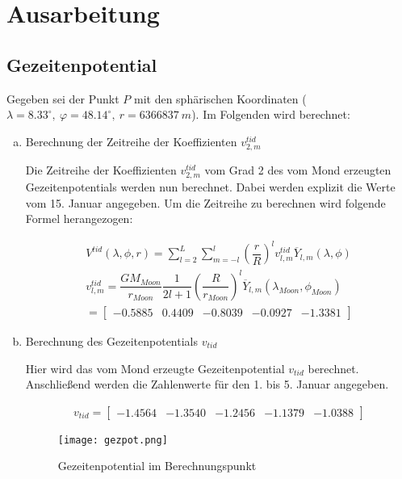 \chapter*{Ausarbeitung}

\section{Gezeitenpotential}

Gegeben sei der Punkt $P$ mit den sphärischen Koordinaten ($\lambda = 8.33^{\circ},~ \varphi = 48.14^{\circ},~r = 6366837~m$). Im Folgenden wird berechnet: 

\begin{enumerate}[a)]
\item Berechnung der Zeitreihe der Koeffizienten $v_{2,m}^{tid}$ 

Die Zeitreihe der Koeffizienten $v_{2,m}^{tid}$ vom Grad 2 des vom Mond erzeugten Gezeitenpotentials werden nun berechnet. Dabei werden explizit die Werte vom 15. Januar angegeben. Um die Zeitreihe zu berechnen wird folgende Formel herangezogen: 

\begin{gather*}
V^{tid}(\lambda, \phi, r) = \sum_{l=2}^{L} \sum_{m=-l}^{l} \left(\dfrac{r}{R}\right)^l v_{l,m}^{tid} \overline{Y}_{l,m}(\lambda,\phi) \\
v_{l,m}^{tid} = \dfrac{GM_{Moon}}{r_{Moon}} \dfrac{1}{2l+1} \left(\dfrac{R}{r_{Moon}}\right)^l \overline{Y}_{l,m} (\lambda_{Moon},\phi_{Moon}) \\
= \begin{bmatrix}
-0.5885 &  0.4409 &  -0.8039  & -0.0927 & -1.3381
\end{bmatrix}
\end{gather*} 

\item Berechnung des Gezeitenpotentials $v_{tid}$ 

Hier wird das vom Mond erzeugte Gezeitenpotential $v_{tid}$ berechnet. Anschließend werden die Zahlenwerte für den 1. bis 5. Januar angegeben. 

\begin{gather*}
v_{tid} = \begin{bmatrix}
-1.4564&-1.3540&-1.2456&-1.1379&-1.0388
\end{bmatrix}
\end{gather*}

\begin{figure}[H]
\centering
\texttt{[image: gezpot.png]}
\caption{Gezeitenpotential im Berechnungspunkt}
\label{gezpot}
\end{figure}


\end{enumerate}
